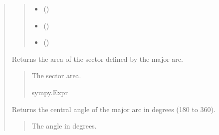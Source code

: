 \documentclass[letterpaper,10pt,english]{sphinxmanual}
\begin{document}
\begin{quote}
\begin{fulllineitems}
\begin{quote}
\begin{description}
\begin{itemize}
\item {} 
\sphinxAtStartPar
{} ()

\item {} 
\sphinxAtStartPar
{} ()

\item {} 
\sphinxAtStartPar
{} (\sphinxstyleliteralemphasis{\sphinxupquote{ | }})

\end{itemize}

\end{description}\end{quote}

\begin{fulllineitems}
\label{\detokenize{pygeox:pygeox.basic_objects.MajorArc.area}}
\pysigstartsignatures
\pysigline
{}
\pysigstopsignatures
\sphinxAtStartPar
Returns the area of the sector defined by the major arc.
\begin{quote}\begin{description}
\sphinxAtStartPar
The sector area.

\sphinxAtStartPar
sympy.Expr

\end{description}\end{quote}

\end{fulllineitems}


\begin{fulllineitems}
\label{\detokenize{pygeox:pygeox.basic_objects.MajorArc.central_angle}}
\pysigstartsignatures
\pysigline
{}
\pysigstopsignatures
\sphinxAtStartPar
Returns the central angle of the major arc in degrees (180 to 360).
\begin{quote}\begin{description}
\sphinxAtStartPar
The angle in degrees.


\end{description}
\end{quote}
\end{fulllineitems}
\end{fulllineitems}
\end{quote}
\end{document}
